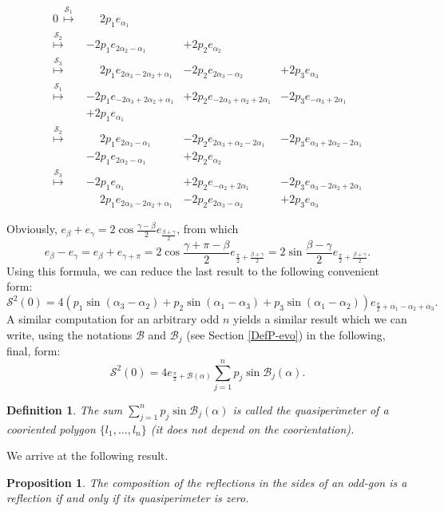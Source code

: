 \documentclass[12pt]{article}
\newtheorem{proposition}[lemma]{Proposition}
\newtheorem{definition}[lemma]{Definition}
\newcommand{\B}{\mathcal{B}}
\begin{document}
\[\begin{array} {rlll} 0\, \mathop{\longmapsto}\limits^{{\mathcal S}_1}&\phantom{-}2p_1e_{\alpha_1}\\ 
\mathop{\longmapsto}\limits^{{\mathcal S}_2}&-2p_1e_{2\alpha_2-\alpha_1}&+2p_2e_{\alpha_2}\\ 
\mathop{\longmapsto}\limits^{{\mathcal S}_3}&\phantom{-}2p_1e_{2\alpha_3-2\alpha_2+\alpha_1}&-2p_2e_{2\alpha_3-\alpha_2}&+2p_3e_{\alpha_3}\\ 
\mathop{\longmapsto}\limits^{{\mathcal S}_1}&-2p_1e_{-2\alpha_3+2\alpha_2+\alpha_1}&+2p_2e_{-2\alpha_3+\alpha_2+2\alpha_1}&-2p_3e_{-\alpha_3+2\alpha_1}\\
&+2p_1e_{\alpha_1}\\
\mathop{\longmapsto}\limits^{{\mathcal S}_2}&\phantom{-}2p_1e_{2\alpha_3-\alpha_1}&-2p_2e_{2\alpha_3+\alpha_2-2\alpha_1}&-2p_3e_{\alpha_3+2\alpha_2-2\alpha_1}\\ 
&-2p_1e_{2\alpha_2-\alpha_1}&+2p_2e_{\alpha_2}\\
\mathop{\longmapsto}\limits^{{\mathcal S}_3}&-2p_1e_{\alpha_1}&+2p_2e_{-\alpha_2+2\alpha_1}&-2p_3e_{\alpha_3-2\alpha_2+2\alpha_1}\\ 
&\phantom{-}2p_1e_{2\alpha_3-2\alpha_2+\alpha_1}&-2p_2e_{2\alpha_3-\alpha_2}&+2p_3e_{\alpha_3}
\end{array}\]

Obviously, $e_\beta+e_\gamma=2\cos\displaystyle\frac{\gamma-\beta}2e_{\frac{\beta+\gamma}2}$, from which$$e_\beta-e_\gamma=e_\beta+e_{\gamma+\pi}=2\cos\frac{\gamma+\pi-\beta}2e_{\scriptstyle{\frac\pi2+\frac{\beta+\gamma}2}}=2\sin\frac{\beta-\gamma}2e_{\scriptstyle{\frac\pi2+\frac{\beta+\gamma}2}}.$$Using this formula, we can reduce the last result to the following convenient form:$${\mathcal S}^2(0)=4(p_1\sin(\alpha_3-\alpha_2)+p_2\sin(\alpha_1-\alpha_3)+p_3\sin(\alpha_1-\alpha_2))e_{\frac\pi2+\alpha_1-\alpha_2+\alpha_3}.$$A similar computation for an arbitrary odd $n$ yields a similar result which we can write, using the notations $\B$ and $\B_j$ (see Section \ref{DefP-evo}) in the following, final, form:
$$
{\mathcal S}^2(0)=4 e_{\frac\pi2+\B(\alpha)} \sum_{j=1}^np_j\sin\B_j(\alpha).
$$

\begin{definition}\label{quasiperimeter}
The sum $\sum_{j=1}^np_j\sin\B_j(\alpha)$ is called the \emph{quasiperimeter} of a cooriented polygon $\{l_1,\dots,l_n\}$ (it does not depend on the coorientation).
\end{definition}
We arrive at the following result. 
\begin{proposition}
The composition of the reflections in the sides of an odd-gon is a reflection if and only if its quasiperimeter is zero. 
\end{proposition}
\end{document}

